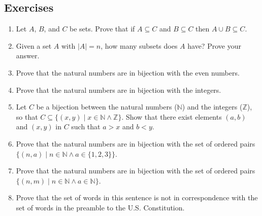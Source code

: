 \subsection{Exercises}
\begin{enumerate}
    \item Let $A$, $B$, and $C$ be sets.  Prove that if $A \subseteq C$ and $B \subseteq C$ then $A \cup B \subseteq C$.

    \item Given a set $A$ with $|A|=n$, how many subsets does $A$ have?  Prove your answer.

    \item Prove that the natural numbers are in bijection with the even numbers.

    \item Prove that the natural numbers are in bijection with the integers.

    \item Let $C$ be a bijection between the natural numbers ($\mathbb{N}$) and the integers ($\mathbb{Z}$), so that $C\subseteq\{(x,y)\mid x\in \mathbb{N}\land \mathbb{Z}\}$.  Show that there exist elements $(a, b)$ and $(x,y)$ in $C$ such that $a > x$ and $b < y$.

    \item Prove that the natural numbers are in bijection with the set of ordered pairs $\{(n, a) \mid n\in \mathbb{N} \land a \in \{1,2,3\}\}$.

    \item Prove that the natural numbers are in bijection with the set of ordered pairs $\{(n, m) \mid n\in \mathbb{N} \land a \in \mathbb{N}\}$.

    \item Prove that the set of words in this sentence is not in correspondence with the set of words in the preamble to the U.S. Constitution.
\end{enumerate}
